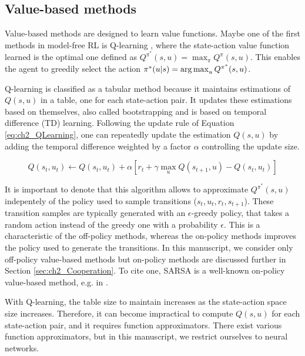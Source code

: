 \subsection{Value-based methods} \label{sec:ch2_value_based_methods}
Value-based methods are designed to learn value functions.
Maybe one of the first methods in model-free RL is Q-learning \citep{watkins1992q}, where the state-action value function learned is the optimal one defined as $Q^{\pi^*}(s, u)=\max_{\pi}Q^\pi(s, u)$.
This enables the agent to greedily select the action $\pi^*(u|s)=\operatorname*{arg\,max}_u Q^{\pi^*}(s, u)$.

Q-learning is classified as a tabular method because it maintains estimations of $Q(s, u)$ in a table, one for each state-action pair.
It updates these estimations based on themselves, also called bootstrapping and is based on temporal difference (TD) learning.
Following the update rule of Equation \ref{eq:ch2_QLearning}, one can repeatedly update the estimation $Q(s, u)$ by adding the temporal difference weighted by a factor $\alpha$ controlling the update size.

\begin{equation}
\label{eq:ch2_QLearning}
    Q(s_t, u_t) \leftarrow Q(s_t, u_t) + \alpha \left[ r_t + \gamma \max_u Q(s_{t+1}, u) - Q(s_t, u_t) \right]
\end{equation}

It is important to denote that this algorithm allows to approximate $Q^{\pi^*}(s, u)$ indepentely of the policy used to sample transitions ($s_t, u_t, r_t, s_{t+1}$).
These transition samples are typically generated with an $\epsilon$-greedy policy, that takes a random action instead of the greedy one with a probability $\epsilon$.
This is a characteristic of the off-policy methods, whereas the on-policy methods improves the policy used to generate the transitions.
In this manuscript, we consider only off-policy value-based methods but on-policy methods are discussed further in Section \ref{sec:ch2_Cooperation}.
To cite one, SARSA is a well-known on-policy value-based method, e.g. in \citep{sutton2018reinforcement}.

With Q-learning, the table size to maintain increases as the state-action space size increases.
Therefore, it can become impractical to compute $Q(s, u)$ for each state-action pair, and it requires function approximators.
There exist various function approximators, but in this manuscript, we restrict ourselves to neural networks.

